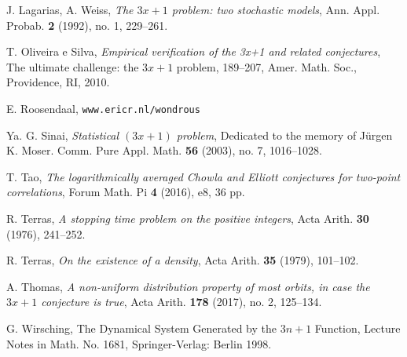 \documentclass[12pt,a4paper,reqno]{amsart}
\numberwithin{equation}{section}
\theoremstyle{plain}
\theoremstyle{definition}
\begin{document}
\begin{thebibliography}{10}
J. Lagarias, A. Weiss, \emph{The $3x+1$ problem: two stochastic models}, Ann. Appl. Probab. \textbf{2} (1992), no. 1, 229--261. 

T. Oliveira e Silva, \emph{Empirical verification of the 3x+1 and related conjectures}, The ultimate challenge: the $3x+1$ problem, 189–207, Amer. Math. Soc., Providence, RI, 2010. 


E. Roosendaal, {\tt www.ericr.nl/wondrous}


Ya. G. Sinai, \emph{Statistical $(3x+1)$ problem}, Dedicated to the memory of J\"urgen K. Moser. Comm. Pure Appl. Math. \textbf{56} (2003), no. 7, 1016--1028.

T. Tao, \emph{The logarithmically averaged Chowla and Elliott conjectures for two-point correlations},  Forum Math. Pi \textbf{4} (2016), e8, 36 pp.

R. Terras, \emph{A stopping time problem on the positive integers}, Acta Arith. \textbf{30} (1976), 241--252.

R. Terras, \emph{On the existence of a density}, Acta Arith. \textbf{35} (1979), 101--102.

A. Thomas, \emph{A non-uniform distribution property of most orbits, in case the $3x+1$ conjecture is true}, 
Acta Arith. \textbf{178} (2017), no. 2, 125--134.

G. Wirsching, The Dynamical System Generated by the $3n + 1$ Function,
Lecture Notes in Math. No. 1681, Springer-Verlag: Berlin 1998. 

\end{thebibliography}
\end{document}
